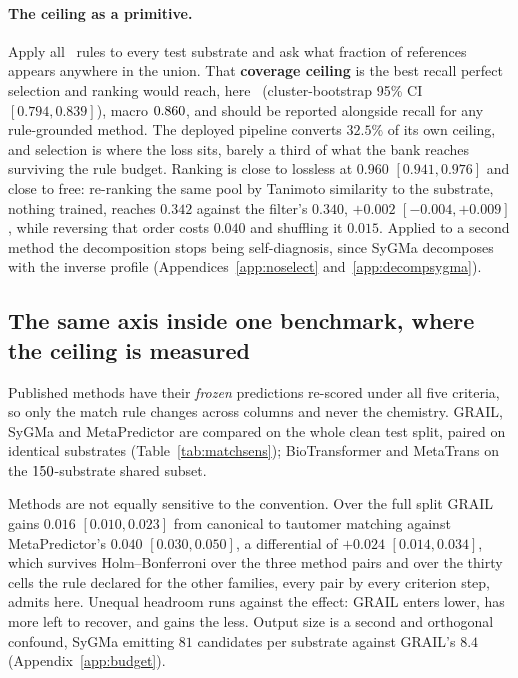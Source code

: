 \paragraph{The ceiling as a primitive.} Apply all \nbank\ rules to every test substrate and ask what
fraction of references appears anywhere in the union. That \textbf{coverage ceiling} is the best recall
perfect selection and ranking would reach, here \ceiling\ (cluster-bootstrap 95\% CI
$[0.794,0.839]$), macro $0.860$, and should be reported alongside recall for any
rule-grounded method. The deployed pipeline
converts $32.5\%$ of its own ceiling, and selection is where the loss sits, barely a third of what
the bank reaches surviving the rule budget. Ranking is close to lossless at $0.960$ $[0.941,0.976]$
and close to free: re-ranking the same pool by Tanimoto similarity to the substrate, nothing trained,
reaches $0.342$ against the filter's $0.340$, $+0.002$ $[-0.004,+0.009]$, while reversing that order
costs $0.040$ and shuffling it $0.015$. Applied to a second method the decomposition stops being
self-diagnosis, since SyGMa decomposes with the inverse profile (Appendices~\ref{app:noselect}
and~\ref{app:decompsygma}).

\subsection{The same axis inside one benchmark, where the ceiling is measured}
\label{sec:rankflip}

Published methods have their \emph{frozen} predictions re-scored under all five criteria, so only
the match rule changes across columns and never the chemistry. GRAIL, SyGMa \citep{Ridder_2008} and
MetaPredictor \citep{Zhu_2024} are compared on the whole clean test split, paired on identical
substrates (Table~\ref{tab:matchsens}); BioTransformer \citep{Djoumbou_Feunang_2019} and MetaTrans
\citep{Litsa_2020} on the $150$-substrate shared subset.

Methods are not equally sensitive to the convention. Over the full split GRAIL gains $0.016$
$[0.010,0.023]$ from canonical to tautomer matching against MetaPredictor's $0.040$
$[0.030,0.050]$, a differential of $+0.024$ $[0.014,0.034]$, which survives Holm--Bonferroni
over the three method pairs and over the thirty cells the rule declared for the other families,
every pair by every criterion step, admits here. Unequal headroom runs against the effect: GRAIL enters lower, has more left
to recover, and gains the less. Output size is a second and orthogonal confound, SyGMa emitting $81$
candidates per substrate against GRAIL's $8.4$ (Appendix~\ref{app:budget}).



